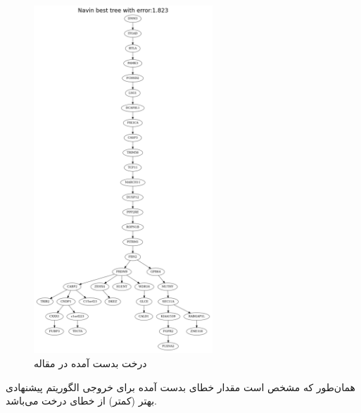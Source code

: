 \begin{figure}[!ht]
	\centering
	\includegraphics[width=0.6\textwidth]{img/chaps/er/navin}
	\caption{درخت بدست آمده در مقاله }
	\label{fig:ch_er:navin_tree}
\end{figure}
\noindent
همان‌طور که مشخص است مقدار خطای بدست آمده برای خروجی الگوریتم پیشنهادی بهتر (کمتر) از خطای درخت  می‌باشد.

